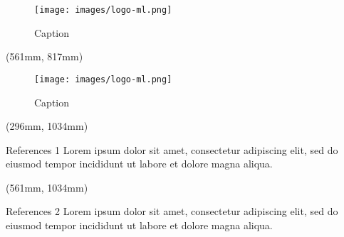 \documentclass{beamer}
\begin{document}
\begin{frame}
\begin{textblock*}{249mm}
\begin{minipage}[t][165mm][t]{\textwidth}
            \begin{figure}
                \centering
                \texttt{[image: images/logo-ml.png]}
                \caption{Caption}
                \label{fig:subfigure1}
            \end{figure}
        \end{minipage}
    \end{textblock*}
    
    \begin{textblock*}{249mm}(561mm, 817mm)
        \begin{minipage}[t][165mm][t]{\textwidth}
            \begin{figure}
                \centering
                \texttt{[image: images/logo-ml.png]}
                \caption{Caption}
                \label{fig:subfigure2}
            \end{figure}
        \end{minipage}
    \end{textblock*}
    
    \begin{textblock*}{249mm}(296mm, 1034mm)
        \begin{minipage}[t][50mm][t]{\textwidth}
            \begin{block}{\small References 1}
                \small Lorem ipsum dolor sit amet, consectetur adipiscing elit, sed do eiusmod tempor incididunt ut labore et dolore magna aliqua.
            \end{block}
        \end{minipage}
    \end{textblock*}
    
    \begin{textblock*}{249mm}(561mm, 1034mm)
        \begin{minipage}[t][50mm][t]{\textwidth}
            \begin{block}{\small References 2}
                \small Lorem ipsum dolor sit amet, consectetur adipiscing elit, sed do eiusmod tempor incididunt ut labore et dolore magna aliqua.
            \end{block}
        \end{minipage}
    \end{textblock*}
    

\end{frame}
\end{document}
